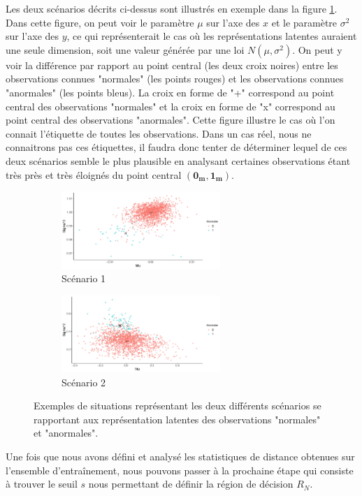 Les deux scénarios décrits ci-dessus sont illustrés en exemple dans la figure \ref{fig:scenarios}. Dans cette figure, on peut voir le paramètre $\mu$ sur l'axe des $x$ et le paramètre $\sigma^2$ sur l'axe des $y$, ce qui représenterait le cas où les représentations latentes auraient une seule dimension, soit une valeur générée par une loi $N(\mu, \sigma^2)$. On peut y voir la différence par rapport au point central (les deux croix noires) entre les observations connues "normales" (les points rouges) et les observations connues "anormales" (les points bleus).  La croix en forme de "+" correspond au point central des observations "normales" et la croix en forme de "x" correspond au point central des observations "anormales". Cette figure illustre le cas où l'on connait l'étiquette de toutes les observations. Dans un cas réel, nous ne connaitrons pas ces étiquettes, il faudra donc tenter de déterminer lequel de ces deux scénarios semble le plus plausible en analysant certaines observations étant très près et très éloignés du point central $(\boldsymbol{0_m}, \boldsymbol{1_m})$.

\begin{figure} [h]
	\centering
	\begin{subfigure}{6cm}
		\includegraphics[width=6cm]{images/plot_near.pdf}
		\caption{Scénario 1}
	\end{subfigure}
	\begin{subfigure}{6cm}
		\includegraphics[width=6cm]{images/plot_away.pdf}
		\caption{Scénario 2}
	\end{subfigure}
	\caption{Exemples de situations représentant les deux différents scénarios se rapportant  aux représentation latentes des observations "normales" et "anormales".}
	\label{fig:scenarios}
\end{figure}

Une fois que nous avons défini et analysé les statistiques de distance obtenues sur l'ensemble d'entraînement, nous pouvons passer à la prochaine étape qui consiste à trouver le seuil $s$ nous permettant de définir la région de décision $R_N$.


